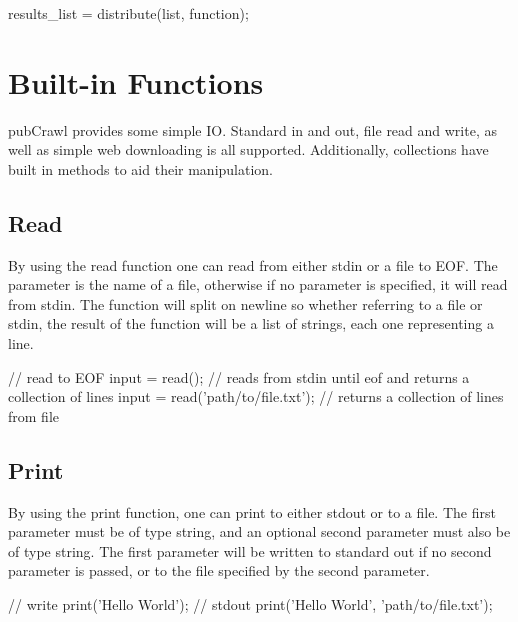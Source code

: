 \documentclass[oneside]{book}
\begin{document}
\begin{mdframed}[hidealllines=true,backgroundcolor=gray!10,skipbelow=.5em,skipabove=.5em]
\begin{code}
results_list = distribute(list, function);
\end{code}
\end{mdframed}



\chapter{Built-in Functions}
pubCrawl provides some simple IO. Standard in and out, file read and write, as well as simple web downloading is all supported. Additionally, collections have built in methods to aid their manipulation.
\section{Read}
By using the read function one can read from either stdin or a file to EOF. The parameter is the name of a file, otherwise if no parameter is specified, it will read from stdin. The function will split on newline so whether referring to a file or stdin, the result of the function will be a list of strings, each one representing a line.
\begin{mdframed}[hidealllines=true,backgroundcolor=gray!10,skipbelow=.5em,skipabove=.5em]
\begin{code}
// read to EOF
input = read(); // reads from stdin until eof and returns a collection of lines
input = read('path/to/file.txt'); // returns a collection of lines from file
\end{code}
\end{mdframed}

\section{Print}
By using the print function, one can print to either stdout or to a file. The first parameter must be of type string, and an optional second parameter must also be of type string. The first parameter will be written to standard out if no second parameter is passed, or to the file specified by the second parameter.\\
\begin{mdframed}[hidealllines=true,backgroundcolor=gray!10,skipbelow=.5em,skipabove=.5em]
\begin{code}
// write
print('Hello World'); // stdout
print('Hello World', 'path/to/file.txt');
\end{code}
\end{mdframed}
\end{document}
